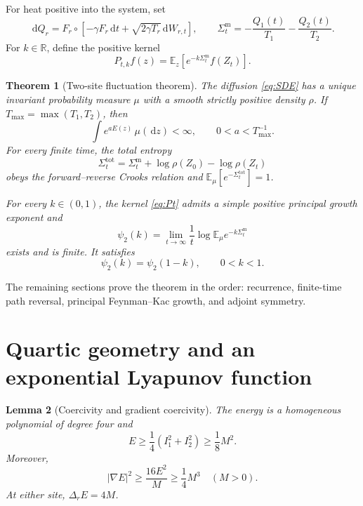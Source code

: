 \documentclass[11pt]{article}
\newtheorem{theorem}{Theorem}[section]
\newtheorem{lemma}[theorem]{Lemma}
\theoremstyle{remark}
\newcommand{\R}{\mathbb R}
\newcommand{\E}{\mathbb E}
\newcommand{\dd}{\,\mathrm d}
\newcommand{\SigmaM}{\Sigma^{\mathrm m}}
\newcommand{\SigmaT}{\Sigma^{\mathrm{tot}}}
\begin{document}
For heat positive into the system, set
\begin{equation}\label{eq:heat}
 \dd Q_r=F_r\circ\left[-\gamma F_r\dd t
 +\sqrt{2\gamma T_r}\dd W_{r,t}\right],
 \qquad
 \SigmaM_t=-\frac{Q_1(t)}{T_1}-\frac{Q_2(t)}{T_2}.
\end{equation}
For $k\in\R$, define the positive kernel
\begin{equation}\label{eq:Pt}
 P_{t,k}f(z)=\E_z\!\left[e^{-k\SigmaM_t}f(Z_t)\right].
\end{equation}

\begin{theorem}[Two-site fluctuation theorem]\label{thm:main}
The diffusion \eqref{eq:SDE} has a unique invariant probability measure
$\mu$ with a smooth strictly positive density $\rho$.  If
$T_{\max}=\max(T_1,T_2)$, then
\begin{equation}\label{eq:exp-moment}
 \int e^{aE(z)}\,\mu(\dd z)<\infty,
 \qquad 0<a<T_{\max}^{-1}.
\end{equation}
For every finite time, the total entropy
\begin{equation}\label{eq:total}
 \SigmaT_t=\SigmaM_t+\log\rho(Z_0)-\log\rho(Z_t)
\end{equation}
obeys the forward--reverse Crooks relation and
$\E_\mu[e^{-\SigmaT_t}]=1$.

For every $k\in(0,1)$, the kernel \eqref{eq:Pt} admits a simple positive
principal growth exponent and
\begin{equation}\label{eq:scgf-def}
 \psi_2(k)=\lim_{t\to\infty}\frac1t
 \log\E_\mu e^{-k\SigmaM_t}
\end{equation}
exists and is finite.  It satisfies
\begin{equation}\label{eq:GC}
 \boxed{\psi_2(k)=\psi_2(1-k),\qquad 0<k<1.}
\end{equation}
\end{theorem}

The remaining sections prove the theorem in the order: recurrence,
finite-time path reversal, principal Feynman--Kac growth, and adjoint
symmetry.

\section{Quartic geometry and an exponential Lyapunov function}

\begin{lemma}[Coercivity and gradient coercivity]\label{lem:geometry}
The energy is a homogeneous polynomial of degree four and
\begin{equation}\label{eq:coercive}
 E\ge\frac14(I_1^2+I_2^2)\ge\frac18M^2.
\end{equation}
Moreover,
\begin{equation}\label{eq:grad-coercive}
 |\nabla E|^2\ge\frac{16E^2}{M}\ge\frac14M^3
 \quad (M>0).
\end{equation}
At either site, $\Delta_rE=4M$.
\end{lemma}
\end{document}
